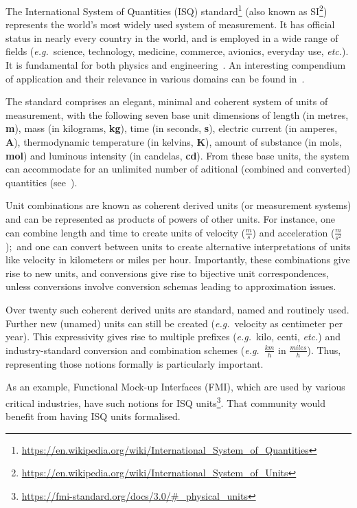 \documentclass[runningheads,a4paper]{llncs}
\begin{document}
The International System of Quantities (ISQ) standard\footnote{\url{https://en.wikipedia.org/wiki/International_System_of_Quantities}} (also known as SI\footnote{\url{https://en.wikipedia.org/wiki/International_System_of_Units}}) represents the world's most widely used system of measurement. It has official status in nearly every country in the world, and is employed in a wide range of fields (\textit{e.g.}~science, technology, medicine, commerce, avionics, everyday use, \textit{etc.}). It is fundamental for both physics and engineering~\cite{bipm-jcgm:2012:VIM}. An interesting compendium of application and their relevance in various domains can be found in~\cite{NPL-book}. 

The standard comprises an elegant, minimal and coherent system of units of measurement, with the following seven base unit dimensions of length (in metres, \textbf{m}), mass (in kilograms, \textbf{kg}), time (in seconds, \textbf{s}), electric current (in amperes, \textbf{A}), thermodynamic temperature (in kelvins, \textbf{K}), amount of substance (in mols, \textbf{mol}) and luminous intensity (in candelas, \textbf{cd}). From these base units, the system can accommodate for an unlimited number of aditional (combined and converted) quantities (see~). 

Unit combinations are known as coherent derived units (or measurement systems) and can be represented as products of powers of other units. For instance, one can combine length and time to create units of velocity (\(\frac{m}{s}\)) and acceleration (\(\frac{m}{s^2}\));~and one can convert between units to create alternative interpretations of units like velocity in kilometers or miles per hour. Importantly, these combinations give rise to new units, and conversions give rise to bijective unit correspondences, unless conversions involve conversion schemas leading to approximation issues. 

Over twenty such coherent derived units are standard, named and routinely used. Further new (unamed) units can still be created (\textit{e.g.}~velocity as centimeter per year). This expressivity gives rise to multiple prefixes (\textit{e.g.}~kilo, centi, \textit{etc.}) and industry-standard conversion and combination schemes (\textit{e.g.}~\(\frac{km}{h}\) in \(\frac{miles}{h}\)). Thus, representing those notions formally is particularly important. 

As an example, Functional Mock-up Interfaces (FMI), which are used by various critical industries, have such notions for ISQ units\footnote{\url{https://fmi-standard.org/docs/3.0/\#_physical_units}}. That community would benefit from having ISQ units formalised.         
\end{document}
